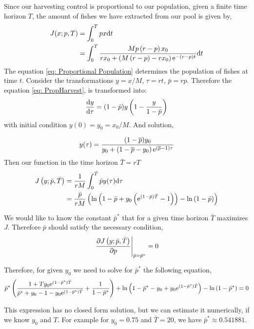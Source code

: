 Since our harvesting control is proportional to our population, given a finite time horizon $T$, the amount of fishes we have extracted from our pool is given by,
\begin{align}
	J(x;p,T)&=\int_{0}^{T} p x \mathrm{d} t \nonumber \\
			&=\int_{0}^{T} \frac{M p\left(r-p\right)x_0}{rx_0+\left(M\left(r-p\right)-rx_0\right)\mathrm{e}^{-(r-p) t}} \mathrm{d} t \nonumber
\end{align}
The equation \ref{eq: Proportional Population} determines the population of fishes at time $t$. Consider the transformations $y=x/M$, $\tau=rt$, $\bar{p}=rp$. Therefore the equation \ref{eq: PropHarvest}, is transformed into:
\begin{equation}
\frac{\mathrm{d} y}{{\mathrm{d} \tau}}=(1-\bar{p})y\left(1-\frac{y}{1-\bar{p}}\right)
\end{equation}
with initial condition $y(0)=y_0=x_0/M$. And solution,

\begin{equation}
	y(\tau)=\frac{(1-\overline p)y_0}{y_0+\left(1-\overline p-y_0\right)\mathrm{e}^{(\overline p-1)\tau}}
\end{equation}
Then our function in the time horizon $\bar{T}=rT$
\begin{align}
J\left(y;\bar{p},\bar{T}\right)&=\frac{1}{rM}\int_0^{\bar{T}}\bar{p}y(\tau)\mathrm{d} \tau	\\
&=\frac{\bar{p}}{rM}\left(\ln\left(1-\bar{p}+y_0\left(\mathrm{e}^{(1-\bar{p})\bar{T}}-1\right)\right)-\ln\left(1-\bar{p}\right)\right)
\end{align}

We would like to know the constant $\bar{p}^*$ that for a given time horizon $\bar{T}$ maximizes $J$. Therefore $\bar{p}$ should satisfy the necessary condition,
\begin{equation}
\left.\frac{\partial J\left(y;\bar{p},\bar{T}\right)}{{\partial p}}\right|_{\bar{p}=\bar{p}^*}=0
\end{equation}

Therefore, for given $y_0$ we need to solve for $\bar{p}^*$ the following equation,
\begin{equation}
\bar{p}^* \left(\frac{1+Ty_0\mathrm{e}^{\left(1-\bar{p}^*\right)\bar{T}}}{\bar{p}^*+y_0-1 -y_0\mathrm{e}^{(1-\bar{p}^*)\bar{T}}}+\frac{1}{1-\bar{p}^*}\right)+\ln
\left(1-\bar{p}^*-y_0 +y_0\mathrm{e}^{(1-\bar{p}^*)\bar{T}}\right)-\ln\left(1-\bar{p}^*\right)=0 \label{eq: Nonlinear equation}
\end{equation}

This expression has no closed form solution, but we can estimate it numerically, if we know $y_0$ and $T$. For example for $y_0=0.75$ and $\bar{T}=20$, we have
$\bar{p}^* \approx 0.541881$.


